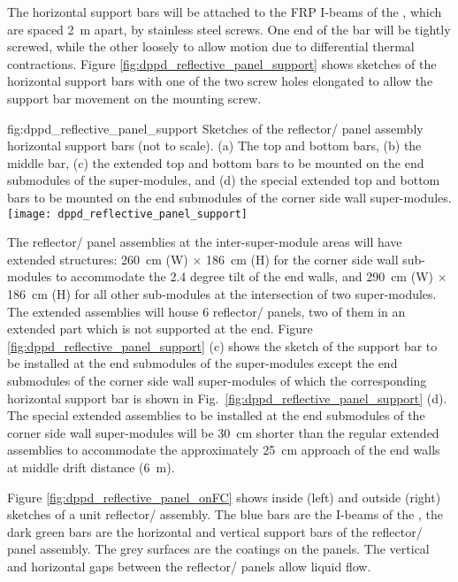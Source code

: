 The horizontal support bars will be attached to the FRP I-beams of the , which are spaced \SI{2}{\m} apart, by stainless steel screws. One end of the bar will be tightly screwed, while the other loosely to allow motion due to differential thermal contractions. Figure \ref{fig:dppd_reflective_panel_support} shows sketches of the horizontal support bars with one of the two screw holes elongated to allow the support bar movement on the mounting screw.

\begin{dunefigure}{fig:dppd_reflective_panel_support}
{Sketches of the reflector/ panel assembly horizontal support bars (not to scale). (a) The top and bottom bars, (b) the middle bar, (c) the extended top and bottom bars to be mounted on the end submodules of the  super-modules, and (d) the special extended top and bottom bars to be mounted on the end submodules of the corner  side wall super-modules.}
\texttt{[image: dppd\_reflective\_panel\_support]}
\end{dunefigure}

The reflector/ panel assemblies at the inter-super-module areas will have extended structures: \SI{260}{\cm} (W) $\times$ \SI{186}{\cm} (H) for the corner side wall  sub-modules to accommodate the \num{2.4} degree tilt of the end walls, and \SI{290}{\cm} (W) $\times$ \SI{186}{\cm} (H) for all other  sub-modules at the intersection of two  super-modules. The extended assemblies will house \num{6} reflector/ panels, two of them in an extended part which is not supported at the end. Figure \ref{fig:dppd_reflective_panel_support} (c) shows the sketch of the support bar to be installed at the end submodules of the  super-modules except the end submodules of the corner  side wall super-modules of which the corresponding horizontal support bar is shown in Fig.~\ref{fig:dppd_reflective_panel_support} (d). The special extended assemblies to be installed at the end submodules of the corner side wall super-modules will be \SI{30}{\cm} shorter than the regular extended assemblies to accommodate the approximately \SI{25}{\cm} approach of the end walls at middle drift distance (\SI{6}{\m}).

Figure \ref{fig:dppd_reflective_panel_onFC} shows inside (left) and outside (right) sketches of a unit reflector/ assembly. The blue bars are the I-beams of the , the dark green bars are the horizontal and vertical support bars of the reflector/ panel assembly. The grey surfaces are the  coatings on the panels. The vertical and horizontal gaps between the reflector/ panels allow liquid flow. 

